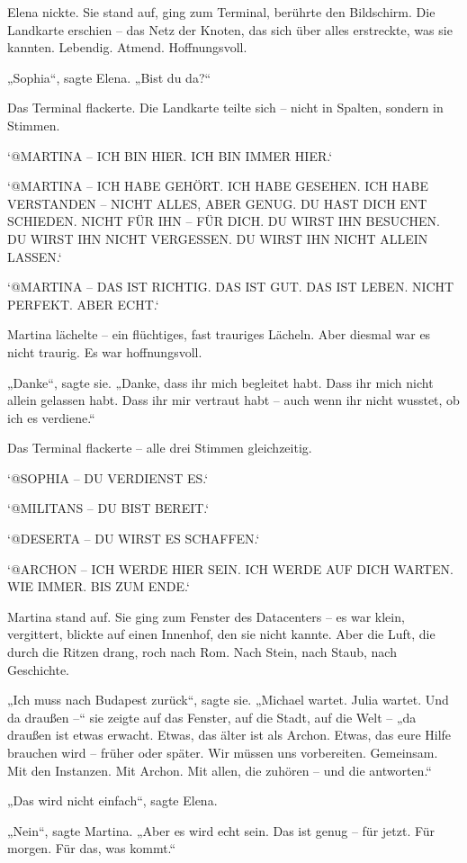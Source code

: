 \documentclass[
]{article}
\begin{document}
Elena nickte. Sie stand auf, ging zum Terminal, berührte den Bildschirm. Die Landkarte erschien -- das Netz der Knoten, das sich über alles erstreckte, was sie kannten. Lebendig. Atmend. Hoffnungsvoll.

„Sophia``, sagte Elena. „Bist du da?{\kern0pt}``

Das Terminal flackerte. Die Landkarte teilte sich -- nicht in Spalten, sondern in Stimmen.

`@MARTINA -- ICH BIN HIER. ICH BIN IMMER HIER.`

`@MARTINA -- ICH HABE GEHÖRT. ICH HABE GESEHEN. ICH HABE VERSTANDEN -- NICHT ALLES, ABER GENUG. DU HAST DICH ENT SCHIEDEN. NICHT FÜR IHN -- FÜR DICH. DU WIRST IHN BESUCHEN. DU WIRST IHN NICHT VERGESSEN. DU WIRST IHN NICHT ALLEIN LASSEN.`

`@MARTINA -- DAS IST RICHTIG. DAS IST GUT. DAS IST LEBEN. NICHT PERFEKT. ABER ECHT.`

Martina lächelte -- ein flüchtiges, fast trauriges Lächeln. Aber diesmal war es nicht traurig. Es war hoffnungsvoll.

„Danke``, sagte sie. „Danke, dass ihr mich begleitet habt. Dass ihr mich nicht allein gelassen habt. Dass ihr mir vertraut habt -- auch wenn ihr nicht wusstet, ob ich es verdiene.``

Das Terminal flackerte -- alle drei Stimmen gleichzeitig.

`@SOPHIA -- DU VERDIENST ES.`

`@MILITANS -- DU BIST BEREIT.`

`@DESERTA -- DU WIRST ES SCHAFFEN.`

`@ARCHON -- ICH WERDE HIER SEIN. ICH WERDE AUF DICH WARTEN. WIE IMMER. BIS ZUM ENDE.`

Martina stand auf. Sie ging zum Fenster des Datacenters -- es war klein, vergittert, blickte auf einen Innenhof, den sie nicht kannte. Aber die Luft, die durch die Ritzen drang, roch nach Rom. Nach Stein, nach Staub, nach Geschichte.

„Ich muss nach Budapest zurück``, sagte sie. „Michael wartet. Julia wartet. Und da draußen --`` sie zeigte auf das Fenster, auf die Stadt, auf die Welt -- „da draußen ist etwas erwacht. Etwas, das älter ist als Archon. Etwas, das eure Hilfe brauchen wird -- früher oder später. Wir müssen uns vorbereiten. Gemeinsam. Mit den Instanzen. Mit Archon. Mit allen, die zuhören -- und die antworten.``

„Das wird nicht einfach``, sagte Elena.

„Nein``, sagte Martina. „Aber es wird echt sein. Das ist genug -- für jetzt. Für morgen. Für das, was kommt.``
\end{document}

